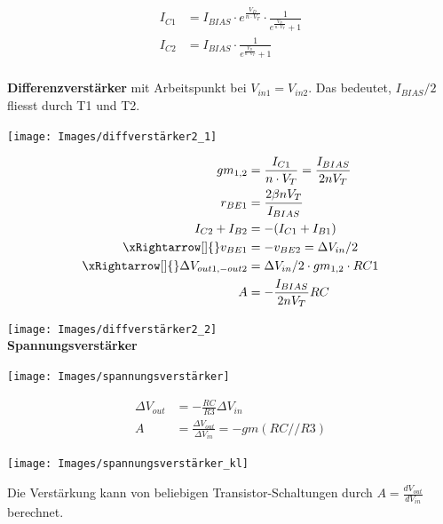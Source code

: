 \begin{minipage}{0.30\textwidth}
	\begin{align*}
		I_{C1} &= I_{BIAS} \cdot e^{\frac{V_D}{n\cdot V_T}} \cdot \frac{1}{e^{\frac{V_D}{n\cdot V_T}} + 1} \\
		I_{C2} &= I_{BIAS} \cdot \frac{1}{e^{\frac{V_D}{n\cdot V_T}} + 1} \\
	\end{align*}
\end{minipage}
\textbf{Differenzverstärker} mit Arbeitspunkt bei $V_{in1} = V_{in2}$. Das bedeutet, $I_{BIAS}/2$ fliesst durch T1 und T2.\\
\begin{minipage}{0.20\textwidth}
	\noindent\texttt{[image: Images/diffverstärker2\_1]}
\end{minipage}%
\begin{minipage}{0.30\textwidth}
	\begin{align*}
		gm_{1,2} &= \frac{I_{C1}}{n\cdot V_T} = \frac{I_{BIAS}}{2nV_T} \\
        r_{BE1} &= \frac{2\beta n V_T}{I_{BIAS}} \\
        I_{C2} + I_{B2} &= - (I_{C1} + I_{B1}) \\
        \xRightarrow[]{} v_{BE1} &= -v_{BE2} = \Delta V_{in} / 2 \\
       \xRightarrow[]{} \Delta V_{out1,-out2} &= \Delta V_{in} / 2 \cdot gm_{1,2} \cdot RC1 \\
       A &= -\frac{I_{BIAS}}{2nV_T}RC
	\end{align*}
\end{minipage}
\noindent\texttt{[image: Images/diffverstärker2\_2]}\\

\textbf{Spannungsverstärker}\\
\begin{minipage}{0.20\textwidth}
	\texttt{[image: Images/spannungsverstärker]}\\
\end{minipage}%
\begin{minipage}{0.30\textwidth}
	\begin{align*}
		\Delta V_{out} &= - \frac{RC}{R3}\Delta V_{in} \\
		A &= \frac{\Delta V_{out}}{\Delta V_{in}} = -gm(RC//R3)
	\end{align*}
\end{minipage}
\texttt{[image: Images/spannungsverstärker\_kl]}

Die Verstärkung kann von beliebigen Transistor-Schaltungen durch $A=\frac{dV_{out}}{dV_{in}}$ berechnet.


